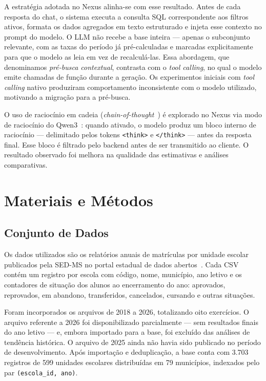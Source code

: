 \documentclass[preprint,10pt,5p]{elsarticle}
\begin{document}
A estratégia adotada no Nexus alinha-se com esse resultado. Antes de cada resposta do chat,
o sistema executa a consulta SQL correspondente aos filtros ativos, formata os dados
agregados em texto estruturado e injeta esse contexto no prompt do modelo. O LLM não recebe
a base inteira — apenas o subconjunto relevante, com as taxas do período já pré-calculadas e
marcadas explicitamente para que o modelo as leia em vez de recalculá-las. Essa abordagem,
que denominamos \textit{pré-busca contextual}, contrasta com o \textit{tool calling}, no
qual o modelo emite chamadas de função durante a geração. Os experimentos iniciais com
\textit{tool calling} nativo produziram comportamento inconsistente com o modelo utilizado,
motivando a migração para a pré-busca.

O uso de raciocínio em cadeia (\textit{chain-of-thought}~\cite{wei2022chain}) é explorado
no Nexus via modo de raciocínio do Qwen3~\cite{qwen3_2025}: quando ativado, o modelo produz
um bloco interno de raciocínio — delimitado pelos tokens \texttt{<think>} e
\texttt{</think>} — antes da resposta final. Esse bloco é filtrado pelo backend antes de
ser transmitido ao cliente. O resultado observado foi melhora na qualidade das estimativas
e análises comparativas.


\section{Materiais e Métodos}
\label{methods}

\subsection{Conjunto de Dados}

Os dados utilizados são os relatórios anuais de matrículas por unidade escolar publicados
pela SED-MS no portal estadual de dados abertos~\cite{seduc_ms}. Cada CSV contém um
registro por escola com código, nome, município, ano letivo e os contadores de situação dos
alunos ao encerramento do ano: aprovados, reprovados, em abandono, transferidos, cancelados,
cursando e outras situações.

Foram incorporados os arquivos de 2018 a 2026, totalizando oito exercícios. O arquivo
referente a 2026 foi disponibilizado parcialmente — sem resultados finais do ano letivo —
e, embora importado para a base, foi excluído das análises de tendência histórica. O arquivo
de 2025 ainda não havia sido publicado no período de desenvolvimento. Após importação e
deduplicação, a base conta com 3.703 registros de 599 unidades escolares distribuídas em
79 municípios, indexados pelo par \texttt{(escola\_id, ano)}.
\end{document}
